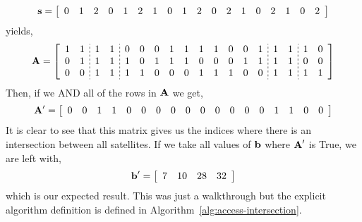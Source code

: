 \begin{equation*} 
    \bm{\mathrm{s}} = 
    \left[
    \begin{array}{cccccccccccccccccc}
	0 & 1 & 2 & 0 & 1 & 2 & 1 & 0 & 1 & 2 & 0 & 2 & 1 & 0 & 2 & 1 & 0 & 2 \\
    \end{array}
    \right]
\end{equation*}
yields,
\begin{equation*} 
    \se{A} = 
    \left[
	\begin{array}{cc;{2pt/2pt}cc;{2pt/2pt}cccccccccc;{2pt/2pt}cc;{2pt/2pt}cc}
	1 & 1 & 1 & 1 & 0 & 0 & 0 & 1 & 1 & 1 & 1 & 0 & 0 & 1 & 1 & 1 & 1 & 0 \\
	0 & 1 & 1 & 1 & 1 & 0 & 1 & 1 & 1 & 0 & 0 & 0 & 1 & 1 & 1 & 1 & 0 & 0 \\
	0 & 0 & 1 & 1 & 1 & 1 & 0 & 0 & 0 & 1 & 1 & 1 & 0 & 0 & 1 & 1 & 1 & 1 \\
    \end{array}
    \right]
\end{equation*}
Then, if we AND all of the rows in $\bm{\mathrm{A}}$ we get,
\begin{equation*} 
    \bm{\mathrm{A}}' = 
    \left[
    \begin{array}{cccccccccccccccccc}
	0 & 0 & 1 & 1 & 0 & 0 & 0 & 0 & 0 & 0 & 0 & 0 & 0 & 0 & 1 & 1 & 0 & 0 \\
    \end{array}
    \right]
\end{equation*}
It is clear to see that this matrix gives us the indices where there is an
intersection between all satellites. If we take all values of $\bm{\mathrm{b}}$ where
$\bm{\mathrm{A}}'$ is True, we are left with,
\begin{equation*} 
    \bm{\mathrm{b}}' = 
    \left[
    \begin{array}{cccccccccccccccccc}
	7 & 10 & 28 & 32
    \end{array}
    \right]
\end{equation*}
which is our expected result. This was just a walkthrough but the explicit
algorithm definition is defined in Algorithm~\ref{alg:access-intersection}.

